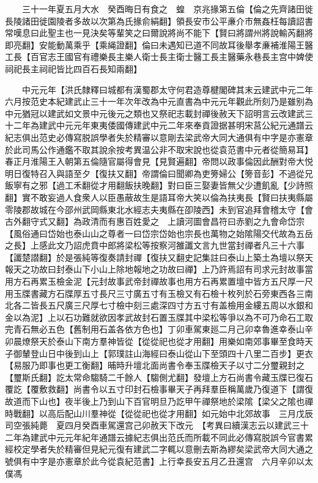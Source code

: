 　　三十一年夏五月大水　癸酉晦日有食之　蝗　京兆掾第五倫【倫之先齊諸田徙長陵諸田徙園陵者多故以次第為氏掾俞絹翻】領長安市公平亷介市無姦枉每讀詔書常嘆息曰此聖主也一見決矣等輩笑之曰爾說將尚不能下【賢曰將謂州將說輸芮翻將即亮翻】安能動萬乘乎【乘䋲證翻】倫曰未遇知已道不同故耳後舉孝亷補淮陽王醫工長【百官志王國官有禮樂長主樂人衛士長主衛士醫工長主醫藥永巷長主宫中婢使祠祀長主祠祀皆比四百石長知兩翻】

　　中元元年【洪氏隸釋曰城都有漢蜀郡太守何君造尊楗閣碑其末云建武中元二年六月按范史本紀建武止三十一年次年改為中元直書為中元元年觀此所刻乃是雖别為中元猶冠以建武如文景中元後元之類也又祭祀志載封禪後赦天下詔明言云改建武三十二年為建武中元元年東夷倭國傳建武中元二年來奉貢證据甚明宋莒公紀元通譜云紀志俱出范史必傳寫脱誤學者失於精審以意剛去梁武帝大同大通俱有中字是亦憲章於此司馬公作通鑑不取其說余按考異温公非不取宋說也從袁范書中元者從簡易耳】春正月淮陽王入朝第五倫隨官屬得會見【見賢遍翻】帝問以政事倫因此酬對帝大悦明日復特召入與語至夕【復扶又翻】帝謂倫曰聞卿為吏篣婦公【篣音彭】不過從兄飯寧有之邪【過工禾翻從才用翻飯扶晚翻】對曰臣三娶妻皆無父少遭飢亂【少詩照翻】實不敢妄過人食衆人以臣愚蔽故生是語耳帝大笑以倫為扶夷長【賢曰扶夷縣屬零陵郡故城在今邵州武岡縣東北水經志夫夷縣在卲陵西】未到官追拜會稽太守【會古外翻守式又翻】為政清而有惠百姓愛之　上讀河圖會昌符曰赤劉之九會命岱宗【風俗通曰岱始也泰山山之尊者一曰岱宗岱始也宗長也萬物之始隂陽交代故為五岳之長】上感此文乃詔虎賁中郎將梁松等按察河雒讖文言九世當封禪者凡三十六事【讖楚譛翻】於是張純等復奏請封禪【復扶又翻史記集註曰泰山上築土為壇以祭天報天之功故曰封泰山下小山上除地報地之功故曰禪】上乃許焉詔有司求元封故事當用方石再累玉檢金泥【元封故事武帝封禪故事也用方石再累置壇中皆方五尺厚一尺用玉牒書藏方石牒厚五寸長尺三寸廣五寸有玉檢又有石檢十枚列於石旁東西各三南北各二皆長五尺廣三尺厚七寸檢中刻三處深四寸方五寸有盖檢用金縷五周以水銀和金以為泥】上以石功難就欲因孝武故封石置玉牒其中梁松等爭以為不可乃命石工取完青石無必五色【舊制用石盖各依方色也】丁卯車駕東廵二月己卯幸魯進幸泰山辛卯晨燎祭天於泰山下南方羣神皆從【從從祀也從才用翻】用樂如南郊事畢至食時天子御輦登山日中後到山上【郭璞註山海經曰泰山從山下至頭四十八里二百步】更衣【易服乃即事也更工衡翻】晡時升壇北面尚書令奉玉牒檢天子以寸二分璽親封之【璽斯氏翻】訖太常命騶騎二千餘人【騶側尤翻】發壇上方石尚書令藏玉牒已復石覆訖【覆敷救翻】尚書令以五寸印封石檢事畢天子再拜羣臣稱萬歲乃復道下【謂復故道而下山也】夜半後上乃到山下百官明旦乃訖甲午禪祭地於梁隂【梁父之隂也禪時戰翻】以高后配山川羣神從【從從祀也從才用翻】如元始中北郊故事　三月戊辰司空張純薨　夏四月癸酉車駕還宫己卯赦天下改元　【考異曰續漢志云以建武三十二年為建武中元元年紀年通譜云據紀志俱出范氏而所載不同此必傳寫脱誤今官書累經校定學者失於精審但見紀元復有建武二字輒以意刪去斯為繆矣梁武帝大同大通之號俱有中字是亦憲章於此今從袁紀范書】上行幸長安五月乙丑還宫　六月辛卯以太僕馮

